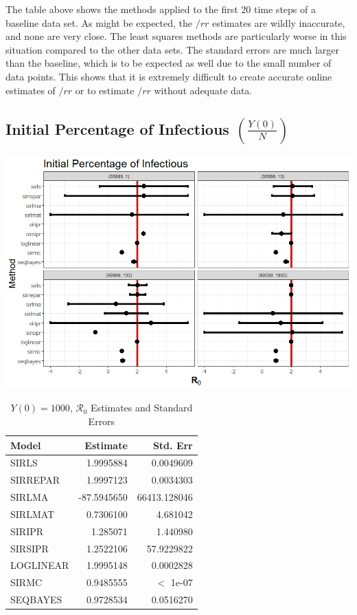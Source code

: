 \documentclass[12pt]{article}
\newcommand{\rr}{\ensuremath{\mathcal{R}_0}}
\begin{document}
The table above shows the methods applied to the first 20 time steps of a baseline data set. As might be expected, the $/rr$ estimates are wildly inaccurate, and none are very close. The least squares methods are particularly worse in this situation compared to the other data sets. The standard errors are much larger than the baseline, which is to be expected as well due to the small number of data points. This shows that it is extremely difficult to create accurate online estimates of $/rr$ or to estimate $/rr$ without adequate data. 

\subsection{Initial Percentage of Infectious $\left (\frac{Y(0)}{N}\right)$}\label{sec:res-inf}

\includegraphics[scale=0.5]{start.jpeg}

\begin{table}[H]
	
	\caption{\label{tab:}$Y(0) = 1000$, $\rr$ Estimates and Standard Errors}
	\centering
	\begin{tabular}[t]{l|r|r}
		\hline
		Model & Estimate & Std. Err\\
		\hline
		SIRLS & 1.9995884 & 0.0049609\\
		\hline
		SIRREPAR & 1.9997123 & 0.0034303\\
		\hline
		SIRLMA & -87.5945650 & 66413.128046\\
		\hline
		SIRLMAT & 0.7306100 & 4.681042\\
		\hline
		SIRIPR & 1.285071 & 1.440980\\
		\hline
		SIRSIPR & 1.2522106 & 57.9229822 \\
		\hline
		LOGLINEAR & 1.9995148 & 0.0002828\\
		\hline
		SIRMC & 0.9485555 & $<$ 1e-07\\
		\hline
		SEQBAYES & 0.9728534 & 0.0516270\\
		\hline
	\end{tabular}
\end{table}
\end{document}
